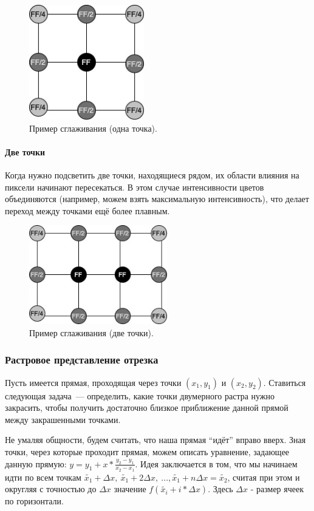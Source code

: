 \begin{figure}[H]
    \centering
    \includegraphics[width=5cm]{smooth_one.jpg}
    \caption{Пример сглаживания (одна точка).}
    \label{fig:float}
\end{figure}

\paragraph*{Две точки}
Когда нужно подсветить две точки, находящиеся рядом, их области влияния на пиксели начинают пересекаться. В этом случае интенсивности цветов объединяются (например, можем взять максимальную интенсивность), что делает переход между точками ещё более плавным.

\begin{figure}[H]
    \centering
    \includegraphics[width=6cm]{smooth_two.jpg}
    \caption{Пример сглаживания (две точки).}
    \label{fig:float}
\end{figure}

\subsubsection*{Растровое представление отрезка}
Пусть имеется прямая, проходящая через точки $(x_1, y_1)$ и $(x_2, y_2)$. Ставиться следующая задача~--- определить, какие точки двумерного растра нужно закрасить, чтобы получить достаточно близкое приближение данной прямой между закрашенными точками.

Не умаляя общности, будем считать, что наша прямая ``идёт'' вправо вверх. Зная точки, через которые проходит прямая, можем описать уравнение, задающее данную прямую: $y = y_1 + x * \frac {y_2 - y_1} {x_2 - x_1}$. Идея заключается в том, что мы начинаем идти по всем точкам $\tilde{x_1} + \Delta x, \ \tilde{x_1} + 2\Delta x, \ ..., \tilde{x_1} + n \Delta x = \tilde{x_2}$, считая при этом и округляя с точностью до $\Delta x$ значение $f(\tilde{x_i} + i *\Delta x)$. Здесь $\Delta x$ - размер ячеек по горизонтали.

